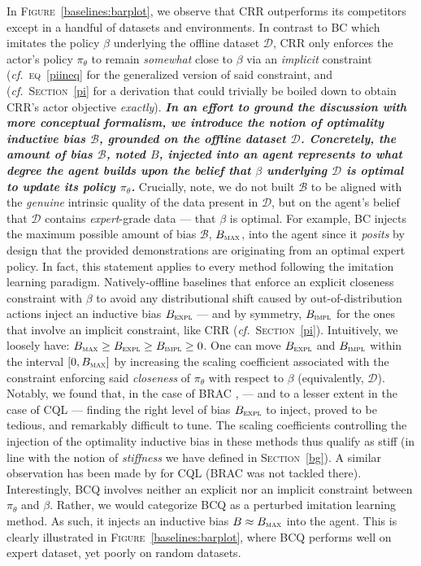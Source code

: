 In \textsc{Figure}~\ref{baselines:barplot},
we observe that CRR
outperforms its competitors except in a handful of datasets and environments.
In contrast to BC which imitates the policy $\beta$ underlying the offline dataset $\mathcal{D}$,
CRR only enforces the actor's policy $\pi_\theta$ to remain \emph{somewhat} close to $\beta$
via an \emph{implicit} constraint (\textit{cf.}~\textsc{eq}~\ref{piineq} for the generalized version of
said constraint, and (\textit{cf.}~\textsc{Section}~\ref{pi} for a derivation that could trivially be boiled down
to obtain CRR's actor objective \textit{exactly}).
\textbf{\emph{In an effort to ground the discussion with more conceptual formalism, we introduce
the notion of \emph{optimality inductive bias} $\mathcal{B}$, grounded on the offline dataset $\mathcal{D}$.
Concretely, the amount of bias $\mathcal{B}$, noted $B$, injected into an agent
represents to what degree the agent builds upon the belief that $\beta$ underlying $\mathcal{D}$
is \emph{optimal} to update its policy $\pi_\theta$.}}
Crucially, note, we do not built $\mathcal{B}$ to be aligned with the
\emph{genuine} intrinsic quality of the data present in $\mathcal{D}$,
but on the agent's belief that $\mathcal{D}$ contains \textit{expert}-grade data
--- that $\beta$ is optimal.
For example, BC
injects the maximum possible amount of bias $\mathcal{B}$,
$B_\textsc{max}$, into the agent since it \emph{posits} by design that the
provided demonstrations are originating from an optimal expert policy.
In fact, this statement applies to every method following the
imitation learning paradigm.
Natively-offline baselines that enforce an explicit closeness constraint with $\beta$ to avoid any
distributional shift caused by out-of-distribution actions inject an inductive bias $B_\textsc{expl}$
--- and by symmetry,
$B_\textsc{impl}$ for the ones that involve an implicit constraint, like CRR
(\textit{cf.}~\textsc{Section}~\ref{pi}).
Intuitively, we loosely have: $B_\textsc{max} \geq B_\textsc{expl} \geq B_\textsc{impl} \geq 0$.
One can move $B_\textsc{expl}$ and $B_\textsc{impl}$ within the interval
$[0, B_\textsc{max}]$ by increasing the scaling coefficient associated with the constraint enforcing
said \textit{closeness} of $\pi_\theta$ with respect to $\beta$ (equivalently, $\mathcal{D}$).
Notably, we found that, in the case of BRAC \cite{Wu2019-nl},
--- and to a lesser extent in the case of CQL \cite{Kumar2020-zb} ---
finding the right level of bias $B_\textsc{expl}$ to inject,
proved to be tedious, and remarkably difficult to tune.
The scaling coefficients controlling the injection of the optimality inductive bias in these methods
thus qualify as stiff (in line with the notion of \emph{stiffness} we have defined in \textsc{Section}~\ref{bg}).
A similar observation has been made by \cite{Monier2020-tq} for CQL (BRAC was not tackled there).
Interestingly, BCQ \cite{Fujimoto2018-mj}
involves neither an explicit nor an implicit constraint between $\pi_\theta$ and $\beta$.
Rather, we would categorize BCQ as a perturbed imitation learning method.
As such, it injects an inductive bias $B \approx B_\textsc{max}$ into the agent.
This is clearly illustrated in \textsc{Figure}~\ref{baselines:barplot}, where BCQ
performs well on expert dataset, yet poorly on random datasets.

